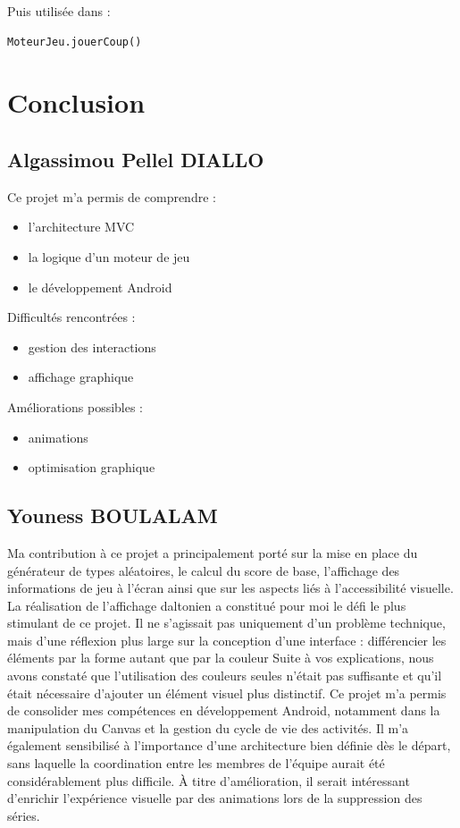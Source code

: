 \documentclass[a4paper,12pt]{article}
\begin{document}
Puis utilisée dans :

\begin{verbatim}
MoteurJeu.jouerCoup()
\end{verbatim}

\section{Conclusion}

\subsection{Algassimou Pellel DIALLO}

Ce projet m’a permis de comprendre :
\begin{itemize}
    \item l’architecture MVC
    \item la logique d’un moteur de jeu
    \item le développement Android
\end{itemize}

Difficultés rencontrées :
\begin{itemize}
    \item gestion des interactions
    \item affichage graphique
\end{itemize}

Améliorations possibles :
\begin{itemize}
    \item animations
    \item optimisation graphique
\end{itemize}

\subsection{Youness BOULALAM}

Ma contribution à ce projet a principalement porté sur la mise en place du générateur
de types aléatoires, le calcul du score de base, l'affichage des informations de jeu
à l'écran ainsi que sur les aspects liés à l'accessibilité visuelle.
La réalisation de l'affichage daltonien a constitué pour moi le défi le plus stimulant
de ce projet. Il ne s'agissait pas uniquement d'un problème technique, mais d'une
réflexion plus large sur la conception d'une interface : différencier les
éléments par la forme autant que par la couleur Suite à vos explications, nous avons constaté que l’utilisation des couleurs seules n’était pas suffisante et qu’il était nécessaire d’ajouter un élément visuel plus distinctif.
Ce projet m'a permis de consolider mes compétences en développement Android,
notamment dans la manipulation du Canvas et la gestion du cycle de vie des activités.
Il m'a également sensibilisé à l'importance d'une architecture bien définie dès le
départ, sans laquelle la coordination entre les membres de l'équipe aurait été
considérablement plus difficile.
À titre d'amélioration, il serait intéressant d'enrichir l'expérience visuelle par
des animations lors de la suppression des séries.
\end{document}

